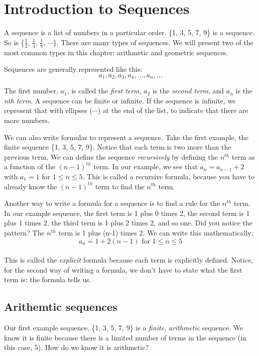 \chapter{Introduction to Sequences}

A sequence is a list of numbers in a particular order. \{1, 3, 5, 7, 
9\} is a sequence. So is \{$\frac{1}{2}$, $\frac{1}{4}$, $\frac{1}{8}$, 
$\cdots$\}. There are many types of sequences. We will present two of 
the most common types in this chapter: arithmetic and geometric 
sequences. 

Sequences are generally represented like this:
$$a_1, a_2, a_3, a_4,...,a_n,...$$

The first number, $a_1$, is called the \textit{first term}, $a_2$ is 
the \textit{second term}, and $a_n$ is the \textit{nth term}. A 
sequence can be finite or infinite. If the sequence is infinite, we 
represent that with ellipses ($\cdots$) at the end of the list, to 
indicate that there are more numbers. 

We can also write formulas to represent a sequence. Take the first 
example, the finite sequence \{1, 3, 5, 7, 9\}. Notice that each term 
is two more than the previous term. We can define the sequence 
\textit{recursively} by defining the $n^{th}$ term as a function of 
the $(n-1)^{th}$ term. In our example, we see that $a_n = a_{n-1}+2$ 
with $a_1 = 1$ for $1 \leq n \leq 5$. This is called a recursive 
formula, because you have to already know the $(n-1)^{th}$ term to 
find the $n^{th}$ term. 

Another way to write a formula for a sequence is to find a rule for 
the $n^{th}$ term. In our example sequence, the first term is 1 plus 
0 times 2, the second term is 1 plus 1 times 2, the third term is 1 
plus 2 times 2, and so one. Did you notice the pattern? The $n^{th}$ 
term is 1 plus (n-1) times 2. We can write this mathematically: $$a_n 
= 1 + 2(n-1)\text{ for } 1 \leq n \leq 5$$\\ 
This is called the \textit{explicit} formula because each term is 
explicitly defined. Notice, for the second way of writing a formula, 
we don't have to state what the first term is: the formula tells us. 

\section{Arithemtic sequences}
Our first example sequence, \{1, 3, 5, 7, 9\} is a \textit{finite}, 
\textit{arithmetic} sequence. We know it is finite because there is a 
limited number of terms in the sequence (in this case, 5). How do we 
know it is arithmetic?

